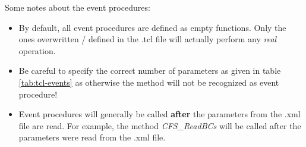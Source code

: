 Some notes about the event procedures:
\begin{itemize}
\item By default, all event procedures are defined as empty
functions. Only the ones overwritten / defined in the .tcl file will
actually perform any {\em real} operation.
\item Be careful to specify the correct number of parameters as given
  in table \ref{tab:tcl-events} as otherwise the method will not be
  recognized as event procedure!
\item Event procedures will generally be called {\bf after} the
  parameters from the .xml file are read. For example, the method
  {\em CFS\_ReadBCs} will be called after the parameters were read from
  the .xml file.
\end{itemize}